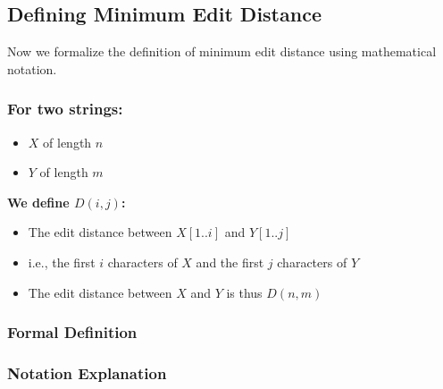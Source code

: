 \documentclass[11pt,a4paper]{article}
\theoremstyle{definition}
\theoremstyle{plain}
\theoremstyle{remark}
\begin{document}
\subsection{Defining Minimum Edit Distance}

Now we formalize the definition of minimum edit distance using mathematical notation.

\begin{tcolorbox}[colback=red!5!white,colframe=red!75!black,title=\textbf{Formal Definition of Edit Distance}]
\subsubsection*{For two strings:}
\begin{itemize}
    \item $X$ of length $n$
    \item $Y$ of length $m$
\end{itemize}

\textbf{We define $D(i,j)$:}
\begin{itemize}
    \item The edit distance between $X[1..i]$ and $Y[1..j]$
    \item i.e., the first $i$ characters of $X$ and the first $j$ characters of $Y$
    \item The edit distance between $X$ and $Y$ is thus $D(n,m)$
\end{itemize}
\end{tcolorbox}

\subsubsection{Formal Definition}

\subsubsection{Notation Explanation}
\end{document}
